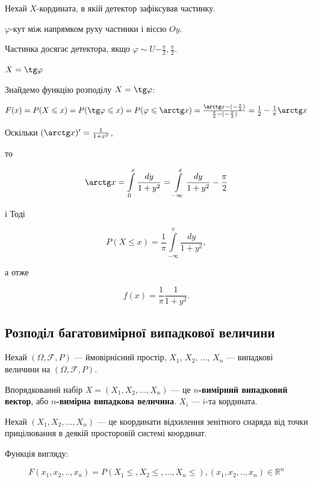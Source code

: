 Нехай $X$-кордината, в якій детектор зафіксував частинку.

\beautifulImage

$\varphi$-кут між напрямком руху частинки і віссю $Oy$.

Частинка досягає детектора, якщо $\varphi \sim U{-\frac{\pi}{2}, \frac{\pi}{2}}$.

$X = \tg \varphi$

Знайдемо функцію розподілу $X = \tg \varphi$:

$F(x)
= P(X \leqslant x)
= P(\tg \varphi \leqslant x)
= P(\varphi \leqslant \arctg x)
= \frac{\arctg x - (-\frac{\pi}{2})}{\frac{\pi}{2} - (-\frac{\pi}{2})}
= \frac{1}{2} - \frac{1}{\pi} \arctg x$

Оскільки $(\arctg x)' = \frac{1}{1+x^2}$,

то

$$\arctg x
= \int\limits_0^x \frac{dy}{1+y^2}
= \int\limits_{-\infty}^x \frac{dy}{1+y^2} - \frac{\pi}{2}$$

і Тоді

$$P(X \leqslant x)
= \frac{1}{\pi} \int\limits_{-\infty}^x \frac{dy}{1+y^2},$$

а отже

$$f(x) = \frac{1}{\pi} \frac{1}{1 + y^2}.$$

\subsection{Розподіл багатовимірної випадкової величини}

Нехай $(\Omega, \mathcal{F}, P)$ --- ймовірнісний простір, $X_1$, $X_2$, ...,
$X_n$ --- випадкові величини на $(\Omega, \mathcal{F}, P)$.

Впорядкований набір $X = (X_1, X_2, ..., X_n)$ --- це
\textbf{$n$-вимірний випадковий вектор}, або \textbf{$n$-вимірна випадкова
величина}. $X_i$ --- $i$-та кордината.

\begin{example}    
    Нехай $(X_1, X_2, ..., X_n)$ --- це координати відхилення зенітного
    снаряда від точки прицілювання в деякій просторовій системі координат.
\end{example}

Функція вигляду:

\begin{equation}
    F(x_1, x_2, .., x_n)
    = P(X_1 \leqslant, X_2 \leqslant, ..., X_n \leqslant),
    (x_1, x_2, .., x_n) \in \mathbb{R}^n
\end{equation}

